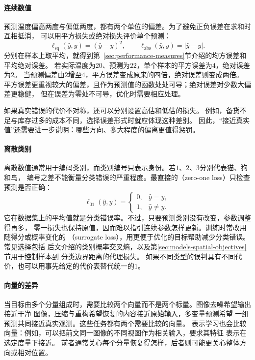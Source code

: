 \paragraph{连续数值}

预测温度偏高两度与偏低两度，都有两个单位的偏差。为了避免正负误差在求和时互相抵消，
可以用平方损失或绝对损失评价单个预测：
\[
  \ell_{\mathrm{sq}}(\hat y,y)=(\hat y-y)^2,\qquad
  \ell_{\mathrm{abs}}(\hat y,y)=|\hat y-y|.
\]
分别在样本上取平均，就得到第~\ref{sec:performance-measures}节介绍的均方误差和平均绝对误差。
若实际温度为$20$、预测为$22$，单个样本的平方误差为$4$，绝对误差为$2$。
当预测偏差由$2$增至$4$，平方误差变成原来的四倍，绝对误差则变成两倍。
平方误差更重视较大的偏差，且作为预测值的函数处处可导；绝对误差对少数大偏差更稳健，
但在误差为零处不可导，优化时需要相应处理。

如果真实错误的代价不对称，还可以分别设置高估和低估的损失。
例如，备货不足与库存过多的成本不同，选择误差形式时就应体现这种差别。
因此，“接近真实值”还需要进一步说明：哪些方向、多大程度的偏离更值得惩罚。

\paragraph{离散类别}

离散数值通常用于编码类别，而类别编号只表示身份。若$1$、$2$、$3$分别代表猫、狗和鸟，
编号之差不能衡量分类错误的严重程度。最直接的（zero-one loss）只检查
预测是否正确：
\begin{equation}
  \ell_{01}(\hat{y},y)=
  \begin{cases}
    0, & \hat{y}=y,\\
    1, & \hat{y}\ne y.
  \end{cases}
  \label{eq:models-zero-one-loss}
\end{equation}
它在数据集上的平均值就是分类错误率。不过，只要预测类别没有改变，参数调整得再多，
零一损失也保持原值，因而难以指引连续参数怎样更新。训练时常改用随得分或概率变化的
（surrogate loss），用更便于优化的目标帮助减少分类错误。常见选择包括
后文介绍的类别概率交叉熵，以及第\ref{sec:models-spatial-objectives}节用于控制样本到
分类边界距离的代理损失。
如果不同类型的误判具有不同代价，也可以用事先给定的代价表替代统一的$1$。

\paragraph{向量的差异}
\label{sec:models-vector-objectives}

当目标由多个分量组成时，需要比较两个向量而不是两个标量。图像去噪希望输出接近干净
图像，压缩与重构希望恢复的内容接近原始输入，多变量预测希望
一组预测共同接近真实观测。这些任务都有两个需要比较的向量。
表示学习也会比较向量：例如，可以把前文同一图像的不同视图作为相关输入，要求其特征
表示在选定度量下接近。
前者通常关心每个分量恢复得怎样，后者则可能更关心整体方向或相对位置。

